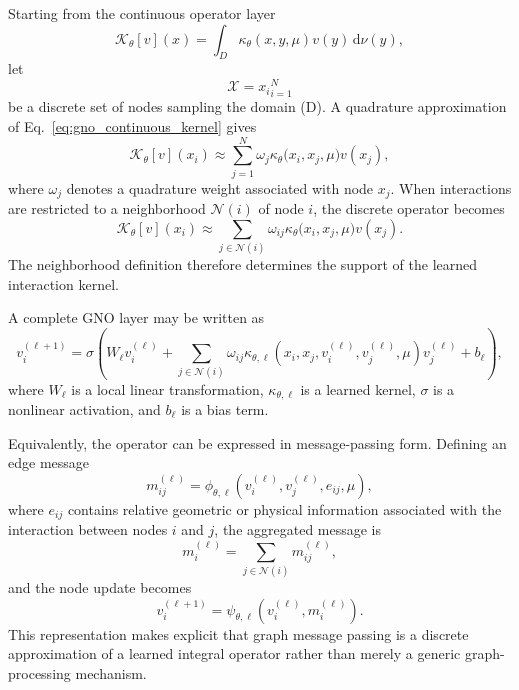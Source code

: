 \documentclass[11pt,a4paper]{article}
\providecommand{\dd}{\,\mathrm{d}}
\begin{document}
\begin{sloppypar}
Starting from the continuous operator layer
\begin{equation}
\mathcal{K}_{\theta}[v](x)
=
\int_D
\kappa_{\theta}(x,y,\mu)
v(y)
\dd\nu(y),
\label{eq:gno_continuous_kernel}
\end{equation}
let
\begin{equation}
\mathcal{X}
=
{x_i}_{i=1}^{N}
\end{equation}
be a discrete set of nodes sampling the domain (D). A quadrature approximation of Eq.~\eqref{eq:gno_continuous_kernel} gives
\begin{equation}
\mathcal{K}_{\theta}[v](x_i)
\approx
\sum_{j=1}^{N}
\omega_j
\kappa_{\theta}
\bigl(
x_i,
x_j,
\mu
\bigr)
v(x_j),
\label{eq:gno_quadrature}
\end{equation}
where $\omega_j$ denotes a quadrature weight associated with node $x_j$. When interactions are restricted to a neighborhood
$\mathcal{N}(i)$ of node $i$,
the discrete operator becomes
\begin{equation}
\mathcal{K}_{\theta}[v](x_i)
\approx
\sum_{j\in\mathcal{N}(i)}
\omega_{ij}
\kappa_{\theta}
\bigl(
x_i,
x_j,
\mu
\bigr)
v(x_j).
\label{eq:gno_local_quadrature}
\end{equation}
The neighborhood definition therefore determines the support of the learned interaction kernel.

A complete GNO layer may be written as
\begin{equation}
v_i^{(\ell+1)}
=
\sigma
\left(
W_{\ell}v_i^{(\ell)}
+
\sum_{j\in\mathcal{N}(i)}
\omega_{ij}
\kappa_{\theta,\ell}
\left(
x_i,
x_j,
v_i^{(\ell)},
v_j^{(\ell)},
\mu
\right)
v_j^{(\ell)}
+
b_{\ell}
\right),
\label{eq:gno_layer_general}
\end{equation}
where $W_{\ell}$ is a local linear transformation,
$\kappa_{\theta,\ell}$ is a learned kernel,
$\sigma$ is a nonlinear activation,
and $b_{\ell}$ is a bias term.

Equivalently, the operator can be expressed in message-passing form. Defining an edge message
\begin{equation}
m_{ij}^{(\ell)}
=
\phi_{\theta,\ell}
\left(
v_i^{(\ell)},
v_j^{(\ell)},
e_{ij},
\mu
\right),
\label{eq:gno_message}
\end{equation}
where $e_{ij}$ contains relative geometric or physical information associated with the interaction between nodes $i$ and $j$, the aggregated message is
\begin{equation}
m_i^{(\ell)}
=
\sum_{j\in\mathcal{N}(i)}
m_{ij}^{(\ell)},
\label{eq:gno_message_aggregation}
\end{equation}
and the node update becomes
\begin{equation}
v_i^{(\ell+1)}
=
\psi_{\theta,\ell}
\left(
v_i^{(\ell)},
m_i^{(\ell)}
\right).
\label{eq:gno_node_update}
\end{equation}
This representation makes explicit that graph message passing is a discrete approximation of a learned integral operator rather than merely a generic graph-processing mechanism.


\end{sloppypar}
\end{document}
